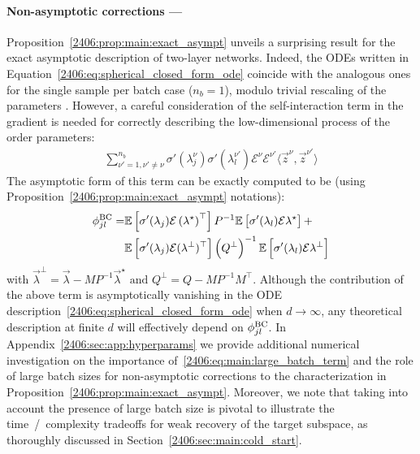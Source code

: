 \paragraph{Non-asymptotic corrections ---}
Proposition~\ref{2406:prop:main:exact_asympt} unveils a surprising result for the exact asymptotic description of two-layer networks. Indeed, the ODEs written in Equation~\eqref{2406:eq:spherical_closed_form_ode} coincide with the analogous ones for the single sample per batch case ($n_b=1$), modulo trivial rescaling of the parameters \cite{veiga2022phase}.  However, a careful consideration of the self-interaction term in the gradient is needed for correctly describing the low-dimensional process of the order parameters:
\begin{align}
    \sum_{\nu' = 1, \nu'\neq\nu}^{n_b} \sigma'(\lambda_j^\nu)\sigma'(\lambda_l^{\nu'})\mathcal{E}^\nu\mathcal{E}^{\nu'} \langle \vec z^{\nu}, \vec z^{\nu'} \rangle 
\end{align}
The asymptotic form of this term can be exactly computed to be (using Proposition~\ref{2406:prop:main:exact_asympt} notations):
\begin{align}
\label{2406:eq:main:large_batch_term}
    \phi^{\rm{BC}}_{jl}=&\mathbb{E}\left[\sigma'(\lambda_j)\mathcal E \left(\lambda^\star\right)^\top\right]P^{-1}\mathbb{E}\left[\sigma'(\lambda_l)\mathcal E \lambda^\star\right]+\\
&\mathbb{E}\left[\sigma'(\lambda_j)\mathcal E (\lambda^\bot)^\top\right]\left(Q^\bot\right)^{-1}\mathbb{E}\left[\sigma'(\lambda_l)\mathcal E \lambda^\bot\right]
\end{align}
with $ \vec \lambda^\bot = \vec \lambda - MP^{-1}\vec\lambda^\star  \text{ and }  
Q^\bot = Q - M P^{-1}M^\top$.
Although the contribution of the above term is asymptotically vanishing in the ODE description~\eqref{2406:eq:spherical_closed_form_ode} when $d \to \infty$, any theoretical description at finite $d$ will effectively depend on $\phi^{\rm{BC}}_{jl}$. In Appendix~\ref{2406:sec:app:hyperparams} we provide additional numerical investigation on the importance of~\eqref{2406:eq:main:large_batch_term} and the role of large batch sizes for non-asymptotic corrections to the characterization in Proposition~\ref{2406:prop:main:exact_asympt}. Moreover, we note that taking into account the presence of large batch size is pivotal to illustrate the time~/~complexity tradeoffs for weak recovery of the target subspace, as thoroughly discussed in Section~\ref{2406:sec:main:cold_start}.
